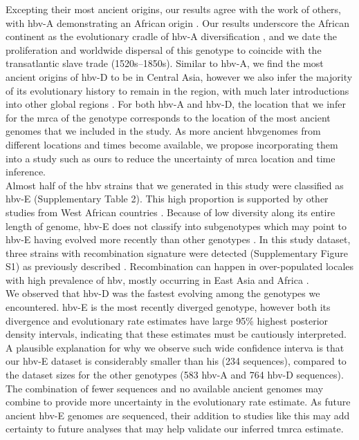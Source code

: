 Excepting their most ancient origins, our results agree with the work of others, with \gls{hbv}-A demonstrating an African origin \citep{pourkarim2011molecular,pourkarim_novel_2010,pourkarim_are_2010,toye_hepatitis_2021}.
Our results underscore the African continent as the evolutionary cradle of \gls{hbv}-A diversification \citep{andernach_slave_2009,toye_hepatitis_2021}, and we date the proliferation and worldwide dispersal of this genotype to coincide with the transatlantic slave trade (1520s--1850s).
Similar to \gls{hbv}-A, we find the most ancient origins of \gls{hbv}-D to be in Central Asia, however we also infer the majority of its evolutionary history to remain in the region, with much later introductions into other global regions \citep{pourkarim2014molecular}.
For both \gls{hbv}-A and \gls{hbv}-D, the location that we infer for the \gls{mrca} of the genotype corresponds to the location of the most ancient genomes that we included in the study.
As more ancient \gls{hbv}genomes from different locations and times become available, we propose incorporating them into a study such as ours to reduce the uncertainty of \gls{mrca} location and time inference.\\

Almost half of the \gls{hbv} strains that we generated in this study were classified as \gls{hbv}-E (Supplementary Table 2).
This high proportion is supported by other studies from West African countries \citep{andernach_slave_2009,assih_genetic_2018}.
Because of low diversity along its entire length of genome, \gls{hbv}-E does not classify into subgenotypes \citep{forbi_epidemic_2010} which may point to \gls{hbv}-E having evolved more recently than other genotypes \citep{ingasia_global_2020}.
In this study dataset, three strains with recombination signature were detected (Supplementary Figure S1) as previously described \citep{mina_genomic_2015,pourkarim_are_2010,forbi_epidemic_2010,liu_complete_2020}.
Recombination can happen in over-populated locales with high prevalence of \gls{hbv}, mostly occurring in East Asia and Africa \citep{pourkarim2014molecular,liu_complete_2020}.\\

We observed that \gls{hbv}-D was the fastest evolving among the genotypes we encountered.
\gls{hbv}-E is the most recently diverged genotype, however both its divergence and evolutionary rate estimates have large 95\% highest posterior density intervals, indicating that these estimates must be cautiously interpreted.
A plausible explanation for why we observe such wide confidence interva is that our \gls{hbv}-E dataset is considerably smaller than his (234 sequences), compared to the dataset sizes for the other genotypes (583 \gls{hbv}-A and 764 \gls{hbv}-D sequences).
The combination of fewer sequences and no available ancient genomes may combine to provide more uncertainty in the evolutionary rate estimate.
As future ancient \gls{hbv}-E genomes are sequenced, their addition to studies like this may add certainty to future analyses that may help validate our inferred \gls{tmrca} estimate.\\

